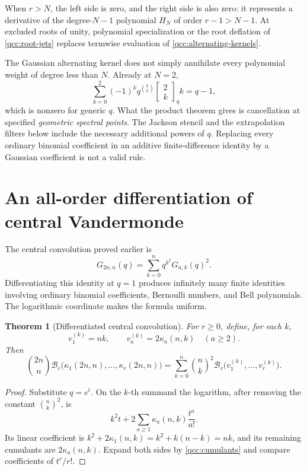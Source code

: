 \documentclass[11pt,a4paper,oneside,openany]{book}
\newtheorem{theorem}{Theorem}[chapter]
\theoremstyle{definition}
\theoremstyle{remark}
\newcommand{\GB}[3][q]{\begin{bmatrix}#2\\#3\end{bmatrix}_{#1}}
\newcommand{\Y}[1]{\mathcal B_{#1}}
\begin{document}
When \(r>N\), the left side is zero, and the right side is also zero:
it represents a derivative of the degree-\(N-1\) polynomial \(H_N\)
of order \(r-1>N-1\). At excluded roots of unity, polynomial
specialization or the root deflation of \cref{qcc:root-jets} replaces
termwise evaluation of \eqref{qcc:alternating-kernels}.

\begin{auditbox}[title={Which cancellation is actually present?}]
The Gaussian alternating kernel does not simply annihilate every polynomial
weight of degree less than \(N\). Already at \(N=2\),
\[
 \sum_{k=0}^{2}(-1)^kq^{\binom k2}\GB2k k=q-1,
\]
which is nonzero for generic \(q\). What the product theorem gives is
cancellation at specified \emph{geometric spectral points}. The Jackson stencil
and the extrapolation filters below include the necessary additional powers of
\(q\). Replacing every ordinary binomial coefficient in an additive
finite-difference identity by a Gaussian coefficient is not a valid rule.
\end{auditbox}

\section{An all-order differentiation of central Vandermonde}
The central convolution proved earlier is
\[
 G_{2n,n}(q)=\sum_{k=0}^{n}q^{k^2}G_{n,k}(q)^2.
\]
Differentiating this identity at \(q=1\) produces infinitely many finite
identities involving ordinary binomial coefficients, Bernoulli numbers, and
Bell polynomials. The logarithmic coordinate makes the formula uniform.

\begin{theorem}[Differentiated central convolution]
\label{qcc:differentiated-central}
For \(r\ge0\), define, for each \(k\),
\[
 v_1^{(k)}=nk,\qquad
 v_a^{(k)}=2\kappa_a(n,k)\quad(a\ge2).
\]
Then
\begin{equation}\label{qcc:differentiated-central-eq}
 \binom{2n}{n}\Y r\bigl(\kappa_1(2n,n),\ldots,\kappa_r(2n,n)\bigr)
 =\sum_{k=0}^{n}\binom nk^2
           \Y r\bigl(v_1^{(k)},\ldots,v_r^{(k)}\bigr).
\end{equation}
\end{theorem}
\begin{proof}
Substitute \(q=e^t\). On the \(k\)-th summand the logarithm, after
removing the constant \(\binom nk^2\), is
\[
 k^2t+2\sum_{a\ge1}\kappa_a(n,k)\frac{t^a}{a!}.
\]
Its linear coefficient is
\(k^2+2\kappa_1(n,k)=k^2+k(n-k)=nk\), and its remaining cumulants
are \(2\kappa_a(n,k)\). Expand both sides by
\cref{qcc:cumulants} and compare coefficients of \(t^r/r!\).
\end{proof}
\end{document}
